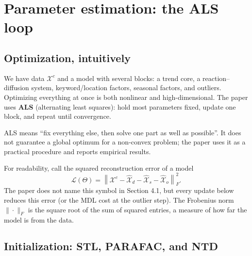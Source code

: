 \section{Parameter estimation: the ALS loop}
\label{sec:estimation}

\subsection{Optimization, intuitively}

We have data $\mathcal{X}^{c}$ and a model with several blocks: a trend core, a reaction--diffusion
system, keyword/location factors, seasonal factors, and outliers. Optimizing everything at once is
both nonlinear and high-dimensional. The paper uses \textbf{ALS} (alternating least squares): hold
most parameters fixed, update one block, and repeat until convergence.

\begin{keypoint}
ALS means ``fix everything else, then solve one part as well as possible''. It does not guarantee a
global optimum for a non-convex problem; the paper uses it as a practical procedure and reports
empirical results.
\end{keypoint}

For readability, call the squared reconstruction error of a model
\begin{equation}
  \mathcal{L}(\Theta)
  =\left\|\mathcal{X}^{c}
    -\widehat{\mathcal{X}}_d-\widehat{\mathcal{X}}_s-\widehat{\mathcal{X}}_o
   \right\|_F^2.
  \label{eq:als-loss}
\end{equation}
The paper does not name this symbol in Section 4.1, but every update below reduces this error (or the
MDL cost at the outlier step). The Frobenius norm $\|\cdot\|_F$ is the square root of the sum of
squared entries, a measure of how far the model is from the data.

\subsection{Initialization: STL, PARAFAC, and NTD}

